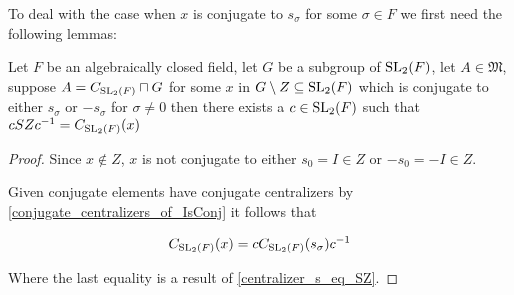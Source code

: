 To deal with the case when $x$ is conjugate to $s_\sigma$ for some $\sigma \in F$ we first need the following lemmas:

\begin{lemma}
  \label{MaximalAbelianSubgroup.centralizer_eq_conj_SZ_of_IsConj_s_or_IsConj_neg_s}
  \leanok

  Let $F$ be an algebraically closed field, let $G$ be a subgroup of $\operatorname{SL}_2(F)$, let $A \in \mathfrak{M}$, suppose $A = C_{\operatorname{SL}_2(F)}\sqcap G$ for some
  $x$ in $G \setminus Z \subseteq \operatorname{SL}_2(F)$ which is conjugate to either $s_\sigma$ or $-s_\sigma$ for $\sigma \ne 0$ then
  there exists a $c \in \operatorname{SL}_2(F)$ such that $cSZc^{-1} = C_{\operatorname{SL}_2(F)}(x)$
\end{lemma}
\begin{proof}
\leanok
Since $x \notin Z$, $x$ is not conjugate to either $s_0 = I \in Z$ or $-s_0 = -I \in Z$.

Given conjugate elements have conjugate centralizers by \ref{conjugate_centralizers_of_IsConj} it follows that 

\[
C_{\operatorname{SL}_2(F)}(x) = c C_{\operatorname{SL}_2(F)}(s_\sigma)c^{-1}
\]

Where the last equality is a result of \ref{centralizer_s_eq_SZ}.
\end{proof}
